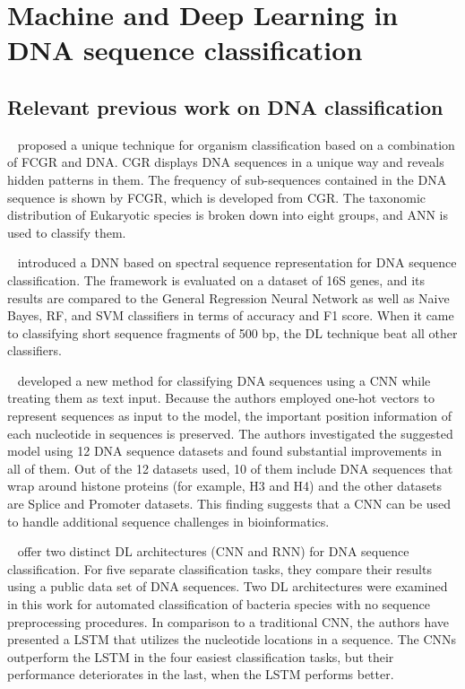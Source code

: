 \chapter{Machine and Deep Learning in DNA sequence classification} \label{sec:ml_dl_dna}

\section{Relevant previous work on DNA classification}\label{sec:previous_work}



\citeauthor{Nair2010ANNRepresentation}~\cite{Nair2010ANNRepresentation} proposed a unique technique for organism classification based on a combination of \gls{FCGR} and \gls{DNA}. \gls{CGR} displays \gls{DNA} sequences in a unique way and reveals hidden patterns in them. The frequency of sub-sequences contained in the \gls{DNA} sequence is shown by \gls{FCGR}, which is developed from \gls{CGR}. The taxonomic distribution of Eukaryotic species is broken down into eight groups, and \gls{ANN} is used to classify them.

\citeauthor{Rizzo2015AClassification}~\cite{Rizzo2015AClassification} introduced a \gls{DNN} based on spectral sequence representation for \gls{DNA} sequence classification. The framework is evaluated on a dataset of 16S genes, and its results are compared to the General Regression Neural Network as well as Naive Bayes, \gls{RF}, and \gls{SVM} classifiers in terms of accuracy and F1 score. When it came to classifying short sequence fragments of 500 bp, the \gls{DL} technique beat all other classifiers.

\citeauthor{Nguyen2016DNANetwork}~\cite{Nguyen2016DNANetwork} developed a new method for classifying \gls{DNA} sequences using a \gls{CNN} while treating them as text input. Because the authors employed one-hot vectors to represent sequences as input to the model, the important position information of each nucleotide in sequences is preserved. The authors investigated the suggested model using 12 \gls{DNA} sequence datasets and found substantial improvements in all of them. Out of the 12 datasets used, 10 of them include DNA sequences that wrap around histone proteins (for example, H3 and H4) and the other datasets are Splice and Promoter datasets. This finding suggests that a \gls{CNN} can be used to handle additional sequence challenges in bioinformatics.

\citeauthor{LoBosco2017DeepClassification}~\cite{LoBosco2017DeepClassification} offer two distinct \gls{DL} architectures (\gls{CNN} and \gls{RNN}) for \gls{DNA} sequence classification. For five separate classification tasks, they compare their results using a public data set of \gls{DNA} sequences. Two \gls{DL} architectures were examined in this work for automated classification of bacteria species with no sequence preprocessing procedures. In comparison to a traditional \gls{CNN}, the authors have presented a \gls{LSTM} that utilizes the nucleotide locations in a sequence. The \gls{CNN}s outperform the \gls{LSTM} in the four easiest classification tasks, but their performance deteriorates in the last, when the \gls{LSTM} performs better. %

